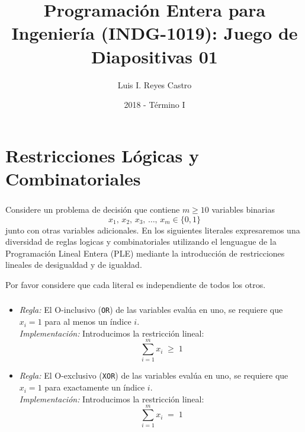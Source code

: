 \documentclass[ 10pt, xcolor = dvipsnames]{beamer}
\title[\shorttitle]{Programaci\'on Entera para Ingenier\'ia (INDG-1019): \textbf{Juego de Diapositivas 01} }
\author[L. I. Reyes Castro]{Luis I. Reyes Castro}
\institute[ESPOL]{\normalsize Escuela Superior Polit\'ecnica del Litoral (ESPOL) \\ Guayaquil - Ecuador}
\date[2018-T1]{2018 - T\'ermino I}
\begin{document}




\section{Restricciones L\'ogicas y Combinatoriales}

\begin{frame}[allowframebreaks]
\frametitle{\insertsection}

Considere un problema de decisi\'on que contiene $m \geq 10$ variables binarias
\[
x_1, \, x_2, \, x_3, \, \dots, \, x_m \in \{ 0, 1 \}
\]
junto con otras variables adicionales. En los siguientes literales expresaremos una diversidad de reglas logicas y combinatoriales utilizando el lenguague de la Programaci\'on Lineal Entera (PLE) mediante la introducci\'on de restricciones lineales de desigualdad y de igualdad. 

Por favor considere que cada literal es independiente de todos los otros. 

\end{frame}

\begin{frame}[allowframebreaks]
\frametitle{\insertsection}

\begin{itemize}
\item \emph{Regla:} El O-inclusivo (\texttt{OR}) de las variables eval\'ua en uno, \ie se requiere \linebreak que $x_i = 1$ para al menos un \'indice $i$. \\[1ex] \emph{Implementaci\'on:} Introducimos la restricci\'on lineal: 
\[
\sum_{i=1}^m x_i \; \geq \; 1
\]
\item \emph{Regla:} El O-exclusivo (\texttt{XOR}) de las variables eval\'ua en uno, \ie se requiere que $x_i = 1$ para exactamente un \'indice $i$. \\[1ex] \emph{Implementaci\'on:} Introducimos la restricci\'on lineal: 
\[
\sum_{i=1}^m x_i \; = \; 1
\]
\end{itemize}

\end{frame}
\end{document}
